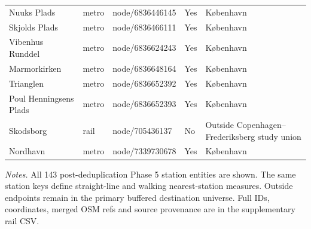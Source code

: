 \begin{landscape}
\begin{longtable}{>{\raggedright\arraybackslash}p{8.0cm}>{\raggedright\arraybackslash}p{2.4cm}>{\raggedright\arraybackslash}p{3.7cm}>{\raggedright\arraybackslash}p{1.5cm}>{\raggedright\arraybackslash}p{5.2cm}}
Nuuks Plads & metro & node/6836446145 & Yes & København \\
Skjolds Plads & metro & node/6836466111 & Yes & København \\
Vibenhus Runddel & metro & node/6836624243 & Yes & København \\
Marmorkirken & metro & node/6836648164 & Yes & København \\
Trianglen & metro & node/6836652392 & Yes & København \\
Poul Henningsens Plads & metro & node/6836652393 & Yes & København \\
Skodsborg & rail & node/705436137 & No & Outside Copenhagen--Frederiksberg study union \\
Nordhavn & metro & node/7339730678 & Yes & København \\
\bottomrule
\end{longtable}
{\footnotesize\noindent\emph{Notes.} All 143 post-deduplication Phase 5 station entities are shown. The same station keys define straight-line and walking nearest-station measures. Outside endpoints remain in the primary buffered destination universe. Full IDs, coordinates, merged OSM refs and source provenance are in the supplementary rail CSV.\par}
\end{landscape}
